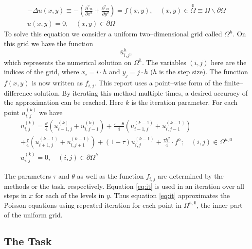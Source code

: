 \documentclass[a4paper,12pt,reqno]{article}
\begin{document}
\begin{equation}\nonumber
    \begin{gathered}
        - \Delta u(x,y) \equiv - \left(\frac{\partial^2 u}{\partial x^2} 
            + \frac{\partial^2 u}{\partial y^2} \right) = f(x,y), 
            \quad (x,y) \in \stackrel{0}{\Omega}
        \equiv \Omega \backslash \partial \Omega    \\
        u(x,y) = 0, \quad (x,y) \in \partial \Omega
    \end{gathered}
\end{equation}
To solve this equation we consider a uniform two--dimensional grid called
$\Omega^h$. On this grid we have the function 
\begin{equation}\nonumber
    \bar u^h_{i,j},
\end{equation}
which represents the numerical solution on $\Omega^h$. The variables $(i,j)$ here
are the indices of the grid, where $x_i = i \cdot h$ and $y_j = j \cdot h$ ($h$
is the step size). The function $f(x,y)$ is now written as $f_{i,j}$.
This report uses a point--wise form of the finite--difference solution. By
iterating this method multiple times, a desired accuracy of the approximation
can be reached. Here $k$ is the iteration parameter. For each point
$u^{(k)}_{i,j}$ we have
\begin{equation}\label{eq:it}
    \begin{gathered}
        u^{(k)}_{i,j} = 
        \frac{\theta}{4}\left( u^{(k)}_{i-1,j} + u^{(k)}_{i,j-1} \right)
    + \frac{\tau-\theta}{4}\left( u^{(k-1)}_{i-1,j} + u^{(k-1)}_{i,j-1}
            \right) \\
    + \frac{\tau}{4}\left( u^{(k-1)}_{i+1,j} + u^{(k-1)}_{i,j+1} \right)
    + (1-\tau) u^{(k-1)}_{i,j} + \frac{\tau h^2}{4}\cdot f^h; \quad (i,j) \in
    \Omega^{h,0}    \\
        u^{(k)}_{i,j} = 0, \quad (i,j) \in \partial \Omega^h
    \end{gathered}
\end{equation}

The parameters $\tau$ and $\theta$ as well as the function $f_{i,j}$ are 
determined by the methods or the task, respectively. Equation \eqref{eq:it} 
is used in an iteration over all steps in $x$ for each of the levels in
$y$. Thus equation \eqref{eq:it} approximates the Poisson equations using repeated
iteration for each point in $\Omega^{h,0}$, the inner part of the uniform grid.\\

\subsection{The Task}
\end{document}
